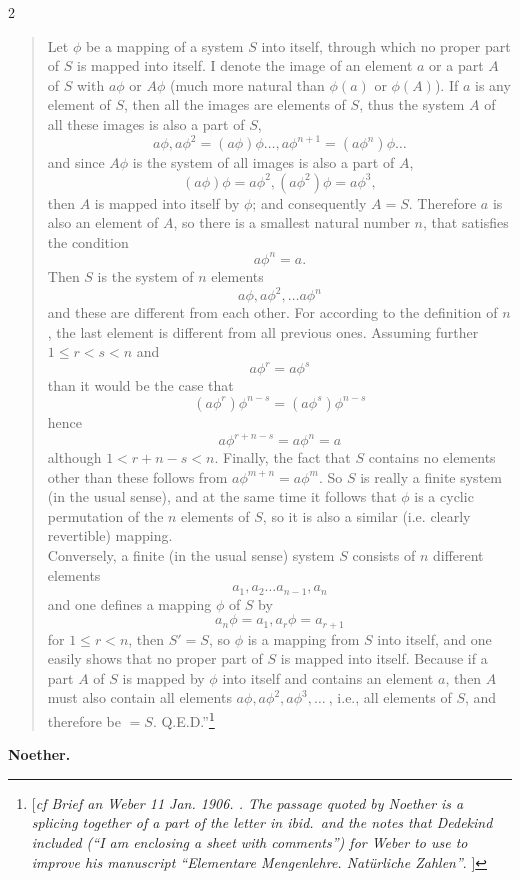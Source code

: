 \documentclass[leqno,hidelinks,10pt]{article}
\theoremstyle{definition}
\newcommand{\QED}{Q.E.D.}
\begin{document}
\begin{paracol}{2}
\begin{rightcolumn}
\begin{quote}
\hspace{12pt} Let $\phi$ be a mapping of a system $S$ into itself, through which
no proper part of $S$ is mapped into itself. I denote the image of an element $a$
or a part $A$ of $S$ with $a\phi$ or $A\phi$ (much more natural than $\phi(a)$
or $\phi(A)$). If $a$ is any element of $S$, then all the images are elements of
$S$, thus the system $A$ of all these images is also a part of $S$,
\vspace{10pt}
\[
    a\phi, a\phi^2= (a\phi)\phi \ldots, a\phi^{n+1} = (a\phi^n)\phi \ldots
\]
and since $A\phi$ is the system of all images is also a part of $A$,
\[
    (a\phi) \phi = a\phi^2, (a\phi^2)\phi = a\phi^3,
\]
then $A$ is mapped into itself by $\phi$; and consequently $A = S$. Therefore $a$
is also an element of $A$, so there is a smallest natural number $n$, that
satisfies the condition
\[
    a\phi^n = a.
\]
Then $S$ is the system of $n$ elements
\[
    a\phi,a\phi^2,\ldots a\phi^n
\]
and these are different from each other.
For according to the definition of $n$, the last element is different from all
previous ones. Assuming further $1 \leq r<s < n$ and
\[
    a\phi^r = a\phi^s
\]
than it would be the case that
\[
    (a\phi^r)\phi^{n-s} = (a\phi^s) \phi^{n-s}
\]
hence
\[
    a\phi^{r+n-s} = a\phi^n=a
\]
although $1<r+n-s<n$.
Finally, the fact that $S$ contains no elements other than these follows from
$a\phi^{m + n} = a\phi^m$. So $S$ is really a finite system (in the usual sense),
and at the same time it follows that $\phi$ is a cyclic permutation of the $n$
elements of $S$, so it is also a similar (i.e. clearly revertible) mapping. \\

\hspace{12pt} Conversely, a finite (in the usual sense) system $S$ consists of
$n$ different elements
\[
    a_1, a_2 \ldots a_{n-1}, a_n
\]
and one defines a mapping $\phi$ of $S$ by
\[
a_n\phi = a_1, a_r\phi=a_{r+1}
\]
for $1\leq r<n$, then $S' = S$, so $\phi$ is a mapping from $S$ into itself, and
one easily shows that no proper part of $S$ is mapped into itself. Because if
a part $A$ of $S$ is mapped by $\phi$ into itself and contains an element $a$,
then $A$ must also contain all elements $a\phi, a\phi^2, a\phi^3, \ldots \ $, i.e.,
all elements of $S$, and therefore be $= S$. \QED''\footnote{[\emph{cf Brief an Weber 11 Jan. 1906. \cite[p.299]{Dedekind-Weber-letters}.
The passage quoted by Noether is a splicing together of a part of the letter in \emph{ibid}.\ and the notes that Dedekind included (``I am enclosing a sheet with comments'') for Weber to use to improve his manuscript ``Elementare Mengenlehre. Natürliche Zahlen''}.
]}
\end{quote}

\begin{flushright}\textbf{Noether.}\end{flushright}



\end{rightcolumn}



\end{paracol}
\end{document}
